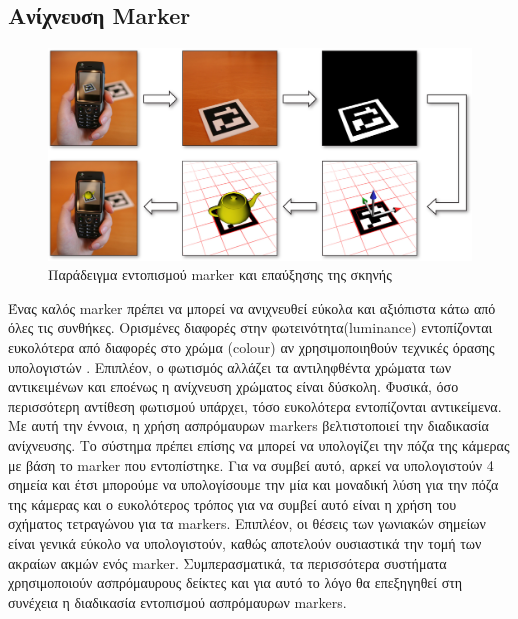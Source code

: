 \subsection{Ανίχνευση Marker}



\begin{figure}[H]
    \centering
    \includegraphics[scale=0.6, angle=0]{Files/Figures/HowMarkersWork.jpg}
    \caption[Παράδειγμα εντοπισμού marker και επαύξησης της σκηνής \cite{howmarkerswork}]{ Παράδειγμα εντοπισμού marker και επαύξησης της σκηνής \cite{howmarkerswork}}
    \label{fig:howmarkerswork}
\end{figure}


Ένας καλός marker πρέπει να μπορεί να ανιχνευθεί εύκολα και αξιόπιστα κάτω από όλες τις συνθήκες. Ορισμένες διαφορές στην φωτεινότητα(luminance) εντοπίζονται ευκολότερα από διαφορές στο χρώμα (colour) αν χρησιμοποιηθούν τεχνικές όρασης υπολογιστών \cite{hartley2003multiple} . Επιπλέον, ο φωτισμός αλλάζει τα αντιληφθέντα χρώματα των αντικειμένων και εποένως η ανίχνευση χρώματος είναι δύσκολη. Φυσικά, όσο περισσότερη αντίθεση φωτισμού υπάρχει, τόσο ευκολότερα εντοπίζονται αντικείμενα. Με αυτή την έννοια, η χρήση ασπρόμαυρων markers βελτιστοποιεί την διαδικασία ανίχνευσης. Το σύστημα πρέπει επίσης να μπορεί να υπολογίζει την πόζα της κάμερας με βάση το marker που εντοπίστηκε. Για να συμβεί αυτό, αρκεί να υπολογιστούν 4 σημεία και έτσι μπορούμε να υπολογίσουμε την μία και μοναδική λύση για την πόζα της κάμερας και ο ευκολότερος τρόπος για να συμβεί αυτό είναι η χρήση του σχήματος τετραγώνου για τα markers. Επιπλέον, οι θέσεις των γωνιακών σημείων είναι γενικά εύκολο να υπολογιστούν, καθώς αποτελούν ουσιαστικά την τομή των ακραίων ακμών ενός marker. Συμπερασματικά, τα περισσότερα συστήματα χρησιμοποιούν ασπρόμαυρους δείκτες και για αυτό το λόγο θα επεξηγηθεί στη συνέχεια η διαδικασία εντοπισμού ασπρόμαυρων markers.    




